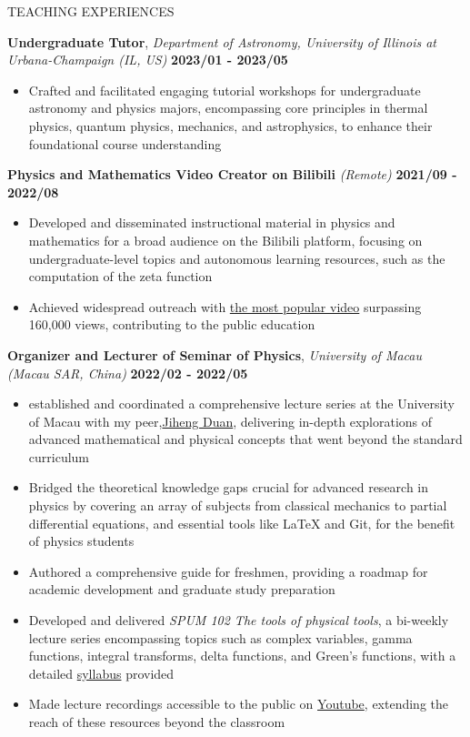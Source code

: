 \documentclass[10pt]{article} %
\begin{document}
\begin{section}{TEACHING EXPERIENCES}

\textbf{Undergraduate Tutor}, \textit{Department of Astronomy, University of Illinois at Urbana-Champaign (IL, US)} \hfill \textbf{2023/01 - 2023/05}
\begin{itemize}[leftmargin=1.5em]
    \item Crafted and facilitated engaging tutorial workshops for undergraduate astronomy and physics majors, encompassing core principles in thermal physics, quantum physics, mechanics, and astrophysics, to enhance their foundational course understanding
\end{itemize}

\textbf{Physics and Mathematics Video Creator on Bilibili} \textit{(Remote)} \hfill \textbf{2021/09 - 2022/08}
\begin{itemize}[leftmargin=1.5em]
    \item Developed and disseminated instructional material in physics and mathematics for a broad audience on the Bilibili platform, focusing on undergraduate-level topics and autonomous learning resources, such as the computation of the zeta function
    \item Achieved widespread outreach with \href{https://www.bilibili.com/video/BV1th411W7xu/}{the most popular video} surpassing 160,000 views, contributing to the public education
\end{itemize}

\textbf{Organizer and Lecturer of Seminar of Physics}, \textit{University of Macau (Macau SAR, China)} \hfill \textbf{2022/02 - 2022/05}
\begin{itemize}[leftmargin=1.5em]
    \item established and coordinated a comprehensive lecture series at the University of Macau with my peer,\href{http://runawayfancy.me/}{Jiheng Duan}, delivering in-depth explorations of advanced mathematical and physical concepts that went beyond the standard curriculum
    \item Bridged the theoretical knowledge gaps crucial for advanced research in physics by covering an array of subjects from classical mechanics to partial differential equations, and essential tools like LaTeX and Git, for the benefit of physics students
    \item Authored a comprehensive guide for freshmen, providing a roadmap for academic development and graduate study preparation
    \item Developed and delivered \textit{SPUM 102 The tools of physical tools}, a bi-weekly lecture series encompassing topics such as complex variables, gamma functions, integral transforms, delta functions, and Green's functions, with a detailed \href{https://github.com/Chisen-Lupus/Seminar-of-Physics-UM/blob/main/SPUM%20102%20The%20tools%20of%20physical%20tool.pdf}{syllabus} provided
    \item Made lecture recordings accessible to the public on \href{https://www.youtube.com/watch?v=nQkv03r-XeQ&list=PLV9fHDZW7hHWQ9rrAk7c9kdeV-Lqyt7pV&index=10}{Youtube}, extending the reach of these resources beyond the classroom
\end{itemize}


\end{section}
\end{document}
